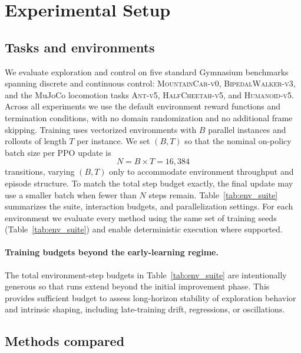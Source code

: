 \section{Experimental Setup}
\label{sec:experimental_setup}

\subsection{Tasks and environments}

We evaluate exploration and control on five standard Gymnasium benchmarks spanning discrete and continuous control: \textsc{MountainCar-v0}, \textsc{BipedalWalker-v3}, and the MuJoCo locomotion tasks \textsc{Ant-v5}, \textsc{HalfCheetah-v5}, and \textsc{Humanoid-v5}.
Across all experiments we use the default environment reward functions and termination conditions, with no domain randomization and no additional frame skipping.
Training uses vectorized environments with $B$ parallel instances and rollouts of length $T$ per instance.
We set $(B,T)$ so that the nominal on-policy batch size per PPO update is
\begin{equation}
    N = B \times T = 16{,}384
\end{equation}
transitions, varying $(B,T)$ only to accommodate environment throughput and episode structure.
To match the total step budget exactly, the final update may use a smaller batch when fewer than $N$ steps remain.
Table~\ref{tab:env_suite} summarizes the suite, interaction budgets, and parallelization settings.
For each environment we evaluate every method using the same set of training seeds (Table~\ref{tab:env_suite}) and enable deterministic execution where supported.



\paragraph{Training budgets beyond the early-learning regime.}
The total environment-step budgets in Table~\ref{tab:env_suite} are intentionally generous so that runs extend beyond the initial improvement phase.
This provides sufficient budget to assess long-horizon stability of exploration behavior and intrinsic shaping, including late-training drift, regressions, or oscillations.

\subsection{Methods compared}
\label{sec:experimental_setup:methods}

